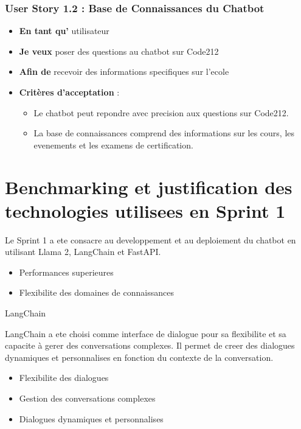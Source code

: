 \documentclass[a4paper, 11pt, openany]{report}
\begin{document}
\subsubsection{User Story 1.2 : Base de Connaissances du Chatbot}

\begin{itemize}
    \item \textbf{En tant qu'} utilisateur
    \item \textbf{Je veux} poser des questions au chatbot sur Code212
    \item \textbf{Afin de} recevoir des informations specifiques sur l’ecole
    \item \textbf{Critères d’acceptation} :
    \begin{itemize}
        \item Le chatbot peut repondre avec precision aux questions sur Code212.
        \item La base de connaissances comprend des informations sur les cours, les evenements et les examens de certification.
    \end{itemize}
\end{itemize}

\section{Benchmarking et justification des technologies utilisees en Sprint 1}

Le Sprint 1 a ete consacre au developpement et au deploiement du chatbot en utilisant Llama 2, LangChain et FastAPI.

\begin{itemize}
\item Performances superieures
\item Flexibilite des domaines de connaissances
\end{itemize}

 LangChain

LangChain a ete choisi comme interface de dialogue pour sa flexibilite et sa capacite à gerer des conversations complexes. Il permet de creer des dialogues dynamiques et personnalises en fonction du contexte de la conversation.

\begin{itemize}
\item Flexibilite des dialogues
\item Gestion des conversations complexes
\item Dialogues dynamiques et personnalises
\end{itemize}
\end{document}
